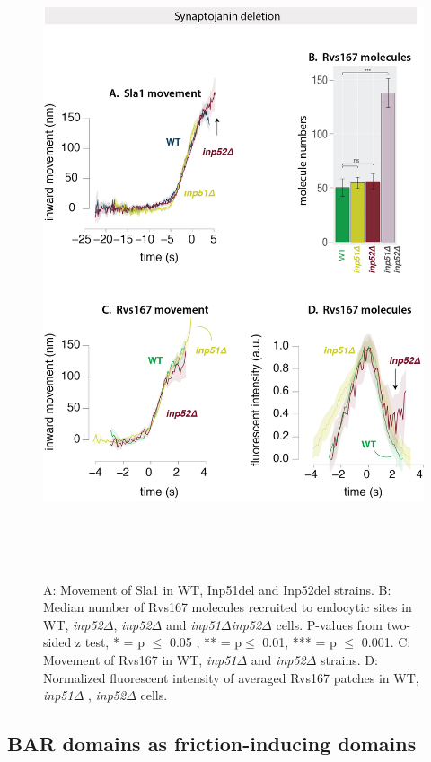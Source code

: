 			\begin{figure}[H]
	\centering
	\includegraphics[width=19cm,height=19cm,keepaspectratio]{figures/results_final/inp_movement3}
	\caption[Synaptojanin deletion]
	{A: Movement of Sla1 in WT, Inp51del and Inp52del strains. 
		B: Median number of Rvs167 molecules recruited to endocytic sites in WT, \textit{inp52$\Delta$}, \textit{inp52$\Delta$ } and \textit{inp51$\Delta$inp52$\Delta$ } cells. P-values from two-sided z test,  * = p $\leq$ 0.05 , ** = p$\leq$ 0.01, *** = p $\leq$ 0.001.  
		C: Movement of Rvs167 in WT, \textit{inp51$\Delta$ } and \textit{inp52$\Delta$ } strains. 
		D: Normalized fluorescent intensity of averaged Rvs167 patches in WT, \textit{inp51$\Delta$ }, \textit{inp52$\Delta$ } cells.
		\label{fig_inpmov}}
\end{figure}

	
	\subsection{BAR domains as friction-inducing domains}
	
